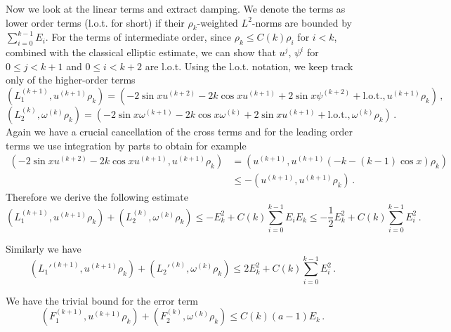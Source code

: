 \documentclass[12pt]{caltech_thesis}
\numberwithin{equation}{section}
\begin{document}
    Now we look at the linear terms and extract damping. We denote the terms as lower order terms (l.o.t. for short) if their $\rho_k$-weighted $L^2$-norms are bounded by $\sum_{i=0}^{k-1}E_i$. For the terms of intermediate order, since  $\rho_k\leq C(k)\rho_i$ for $i<k$, combined with the classical elliptic estimate,  we can show that $u^j$, $\psi^i$ for $0\leq j<k+1$ and $0\leq i<k+2$ are l.o.t.
    Using the l.o.t. notation, we keep track only of the higher-order terms $$(L_1^{(k+1)},u^{(k+1)}\rho_k)=(-2\sin x u^{(k+2)}-2k\cos x u^{(k+1)}+2\sin x \psi^{(k+2)}+\text{l.o.t.},u^{(k+1)}\rho_k)\,,$$
    $$(L_2^{(k)},\omega^{(k)}\rho_k)=(-2\sin x \omega^{(k+1)}-2k\cos x \omega^{(k)}+2\sin x u^{(k+1)}+\text{l.o.t.},\omega^{(k)}\rho_k)\,.$$
    Again we have a crucial cancellation of the cross terms and for the leading order terms we use integration by parts to obtain for example $$\begin{aligned}(-2\sin x u^{(k+2)}-2k\cos x u^{(k+1)},u^{(k+1)}\rho_k)&=(u^{(k+1)},u^{(k+1)}(-k-(k-1)\cos x)\rho_k)\\&\leq -(u^{(k+1)},u^{(k+1)}\rho_k)\,.\end{aligned}$$
    Therefore we derive the following estimate $$(L_1^{(k+1)},u^{(k+1)}\rho_k)+(L_2^{(k)},\omega^{(k)}\rho_k)\leq -E_k^2+C(k)\sum_{i=0}^{k-1}E_i E_k\leq -\frac{1}{2}E_k^2+C(k)\sum_{i=0}^{k-1}E_i^2\,.$$
    
    Similarly we have $$(L_1'^{(k+1)},u^{(k+1)}\rho_k)+(L_2'^{(k)},\omega^{(k)}\rho_k)\leq 2E_k^2+C(k)\sum_{i=0}^{k-1}E_i^2\,.$$
    
    We have the trivial bound for the error term 
    $$(F_1^{(k+1)},u^{(k+1)}\rho_k)+(F_2^{(k)},\omega^{(k)}\rho_k)\leq C(k) (a-1)E_k\,.$$
    
\end{document}
